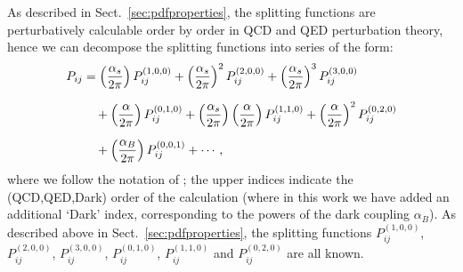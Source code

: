 \documentclass[withindex,glossary]{cam-thesis}
\begin{document}
As described in Sect.~\ref{sec:pdfproperties}, the splitting functions are perturbatively calculable order by order in QCD and QED perturbation theory, hence we can decompose the splitting functions into series of the form:
\begin{align}
\label{eq:splittingexpansion}
P_{ij} &= \left( \frac{\alpha_s}{2\pi} \right) P_{ij}^{(1,0,0)} + \left( \frac{\alpha_s}{2\pi} \right)^2 P_{ij}^{(2,0,0)} + \left(\frac{\alpha_s}{2\pi}\right)^3 P_{ij}^{(3,0,0)} \notag\\[1.5ex]
&\quad+ \left( \frac{\alpha}{2\pi} \right) P_{ij}^{(0,1,0)} + \left( \frac{\alpha_s}{2\pi} \right) \left( \frac{\alpha}{2\pi} \right) P_{ij}^{(1,1,0)} + \left( \frac{\alpha}{2\pi} \right)^2 P_{ij}^{(0,2,0)} \\[1.5ex]
&\quad+ \left( \frac{\alpha_B}{2\pi} \right) P_{ij}^{(0,0,1)} + \cdots, \notag
\end{align}
where we follow the notation of \cite{deFlorian:2015ujt,deFlorian:2016gvk}; the upper indices indicate
the (QCD,QED,Dark) order of the calculation (where in this work we have added an additional `Dark' index, corresponding
to the powers of the dark coupling $\alpha_B$). As described above in Sect.~\ref{sec:pdfproperties}, the splitting functions $P_{ij}^{(1,0,0)}$, $P_{ij}^{(2,0,0)}$, $P_{ij}^{(3,0,0)}$, $P_{ij}^{(0,1,0)}$, $P_{ij}^{(1,1,0)}$ and $P_{ij}^{(0,2,0)}$ are all known.
\end{document}
